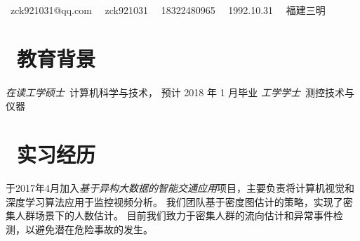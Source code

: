 \documentclass{resume}
\begin{document}

\centerline{\sffamily\large{\faEnvelope\ {zck921031@qq.com} \ \faWeixin\ zck921031 \ \faPhone\ {18322480965} \ \faBirthdayCake\ {1992.10.31} \ \faHome\ {福建三明}} \vspace{1.0ex}}
 
\section{\faGraduationCap\  教育背景}
\textit{在读工学硕士}\ 计算机科学与技术， 预计 2018 年 1 月毕业
\textit{工学学士}\ 测控技术与仪器

\section{\faUsers\ 实习经历}
于2017年4月加入\textsl{基于异构大数据的智能交通应用}项目，主要负责将计算机视觉和深度学习算法应用于监控视频分析。
我们团队基于密度图估计的策略，实现了密集人群场景下的人数估计。
目前我们致力于密集人群的流向估计和异常事件检测，以避免潜在危险事故的发生。
\end{document}
